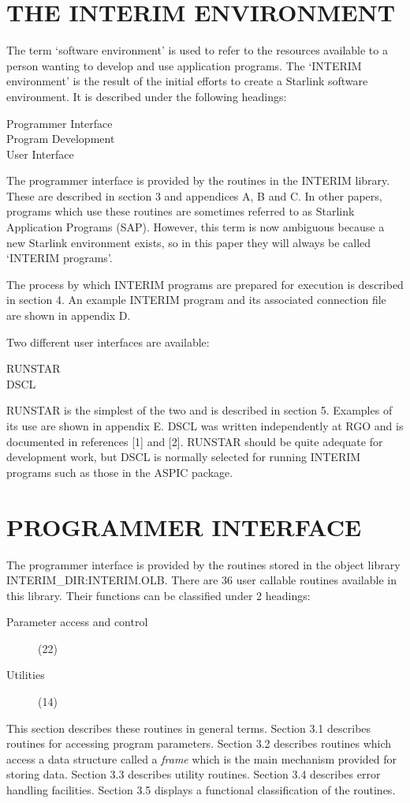\documentclass{article}
\begin{document}
\section {THE INTERIM ENVIRONMENT}
The term `software environment' is used to refer to the resources available
to a person wanting to develop and use application programs.
The `INTERIM environment' is the result of the initial efforts to create a
Starlink software environment.
It is described under the following headings:
\begin{description}
\item [Programmer Interface]
\item [Program Development]
\item [User Interface]
\end{description}
The programmer interface is provided by the routines in the INTERIM library.
These are described in section 3 and appendices A, B and C.
In other papers, programs which use these routines are sometimes referred to as
Starlink Application Programs (SAP).
However, this term is now ambiguous because a new Starlink environment
exists, so in this paper they will always be called `INTERIM programs'.

The process by which INTERIM programs are prepared for execution is described
in section 4.
An example INTERIM program and its associated connection file are shown in
appendix D.

Two different user interfaces are available:
\begin{description}
\item [RUNSTAR]
\item [DSCL]
\end{description}
RUNSTAR is the simplest of the two and is described in section 5.
Examples of its use are shown in appendix E.
DSCL was written independently at RGO and is documented in references [1] and
[2].
RUNSTAR should be quite adequate for development work, but DSCL is normally
selected for running INTERIM programs such as those in the ASPIC package.
\section {PROGRAMMER INTERFACE}
The programmer interface is provided by the routines stored in the object
library INTERIM\_DIR:\-INTERIM.\-OLB.
There are 36 user callable routines available in this library.
Their functions can be classified under 2 headings:
\begin{description}
\item [Parameter access and control] (22)
\item [Utilities] (14)
\end{description}
This section describes these routines in general terms.
Section 3.1 describes routines for accessing program parameters.
Section 3.2 describes routines which access a data structure called a
{\em frame} which is the main mechanism provided for storing data.
Section 3.3 describes utility routines.
Section 3.4 describes error handling facilities.
Section 3.5 displays a functional classification of the routines.
\end{document}
